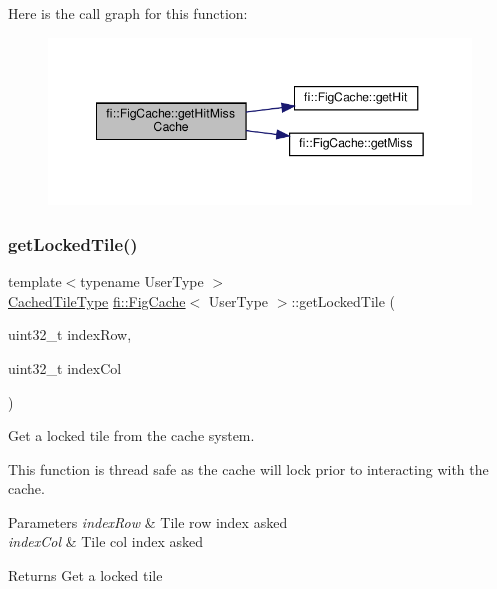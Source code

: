 Here is the call graph for this function\+:
\nopagebreak
\begin{figure}[H]
\begin{center}
\leavevmode
\includegraphics[width=349pt]{d7/d31/classfi_1_1FigCache_a90aff6f08938280b32bbe303913673da_cgraph}
\end{center}
\end{figure}
\mbox{\label{classfi_1_1FigCache_aff587e5ffcbeeab89a0ed4a0629231e3}} 
\subsubsection{\texorpdfstring{get\+Locked\+Tile()}{getLockedTile()}}
{\footnotesize\ttfamily template$<$typename User\+Type $>$ \\
\hyperlink{classfi_1_1FigCache_a7b9bbc4a832c01c3a461f573445c3c41}{Cached\+Tile\+Type} \hyperlink{classfi_1_1FigCache}{fi\+::\+Fig\+Cache}$<$ User\+Type $>$\+::get\+Locked\+Tile (\begin{DoxyParamCaption}\item[{uint32\+\_\+t}]{index\+Row,  }\item[{uint32\+\_\+t}]{index\+Col }\end{DoxyParamCaption})\hspace{0.3cm}{\ttfamily [inline]}}



Get a locked tile from the cache system. 

This function is thread safe as the cache will lock prior to interacting with the cache. 
\begin{DoxyParams}{Parameters}
{\em index\+Row} & Tile row index asked \\
\hline
{\em index\+Col} & Tile col index asked \\
\hline
\end{DoxyParams}
\begin{DoxyReturn}{Returns}
Get a locked tile 
\end{DoxyReturn}


